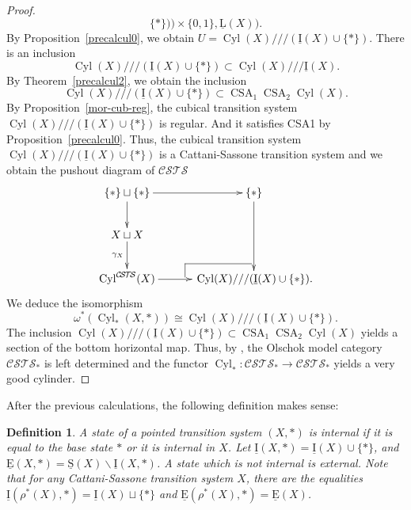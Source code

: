 \documentclass[a4paper,12pt]{amsart}
\newtheorem{defn}[thm]{Definition}
\begin{document}
\begin{proof}
\[\{*\}))\times \{0,1\},\operatorname{\underline{L}}(X)).\] By Proposition~\ref{precalcul0}, we
obtain $U = \operatorname{{Cyl}}(X)///(\operatorname{\underline{I}}(X) \cup \{*\})$. There is an inclusion 
\[\operatorname{{Cyl}}(X)///(\operatorname{\underline{I}}(X) \cup \{*\}) \subset \operatorname{{Cyl}}(X)///\operatorname{\underline{I}}(X).\]
By Theorem~\ref{precalcul2}, we obtain the inclusion 
\[\operatorname{{Cyl}}(X)///(\operatorname{\underline{I}}(X) \cup \{*\}) \subset \operatorname{CSA}_1\operatorname{CSA}_2 \operatorname{{Cyl}}(X).\]
By Proposition~\ref{mor-cub-reg}, the cubical transition system 
$\operatorname{{Cyl}}(X)///(\operatorname{\underline{I}}(X) \cup \{*\})$ is regular. And it satisfies CSA1 by 
Proposition~\ref{precalcul0}. Thus, the cubical transition system 
$\operatorname{{Cyl}}(X)///(\operatorname{\underline{I}}(X) \cup \{*\})$ is a Cattani-Sassone transition system and we obtain 
the pushout diagram of ${\mathcal{C\!S\!T\!S}}$
\[
\xymatrix@C=3em {
  \{*\} \sqcup \{*\} {\ar@{->}[r]^-{{}}} {\ar@{->}[d]_-{{}}} & \{*\} {\ar@{->}[dd]_-{{}}} \\
  X \sqcup X {\ar@{->}[d]_-{{\gamma_X}}} & \\
  \operatorname{{Cyl}}^{\mathcal{C\!S\!T\!S}}(X) {\ar@{->}[r]^-{{}}} & {  \ar@{-}[]+L+<-6pt,+2pt>;[]+LU+<-6pt,+6pt>  \ar@{-}[]+U+<-2pt,+6pt>;[]+LU+<-6pt,+6pt>}
  \operatorname{{Cyl}}(X)///(\operatorname{\underline{I}}(X) \cup \{*\}). }
\] 
We deduce the isomorphism
\[\omega^*(\operatorname{{Cyl}}_{*}(X,*)) {\cong} \operatorname{{Cyl}}(X)///(\operatorname{\underline{I}}(X) \cup \{*\}).\]
The inclusion $\operatorname{{Cyl}}(X)///(\operatorname{\underline{I}}(X) \cup \{*\}) \subset
\operatorname{CSA}_1\operatorname{CSA}_2\operatorname{{Cyl}}(X)$ yields a section of the bottom horizontal
map. Thus, by \cite[Corollary~5.9]{leftdet}, the Olschok model
category ${\mathcal{C\!S\!T\!S}}_*$ is left determined and the functor
$\operatorname{{Cyl}}_*:{\mathcal{C\!S\!T\!S}}_* \to {\mathcal{C\!S\!T\!S}}_*$ yields a very good cylinder. \end{proof}

After the previous calculations, the following definition makes
sense:

\begin{defn} A state of a pointed transition system $(X,*)$ is {\rm internal}
if it is equal to the base state $*$ or it is internal in $X$. Let
$\operatorname{\underline{I}}(X,*)=\operatorname{\underline{I}}(X) \cup \{*\}$, and $\operatorname{\underline{E}}(X,*)=\operatorname{\underline{S}}(X) \backslash
\operatorname{\underline{I}}(X,*)$. A state which is not internal is {\rm external}.  Note
that for any Cattani-Sassone transition system $X$, there are the
equalities $\operatorname{\underline{I}}(\rho^*(X),*) = \operatorname{\underline{I}}(X) \sqcup \{*\}$ and
$\operatorname{\underline{E}}(\rho^*(X),*) = \operatorname{\underline{E}}(X)$.  \end{defn}
\end{document}
